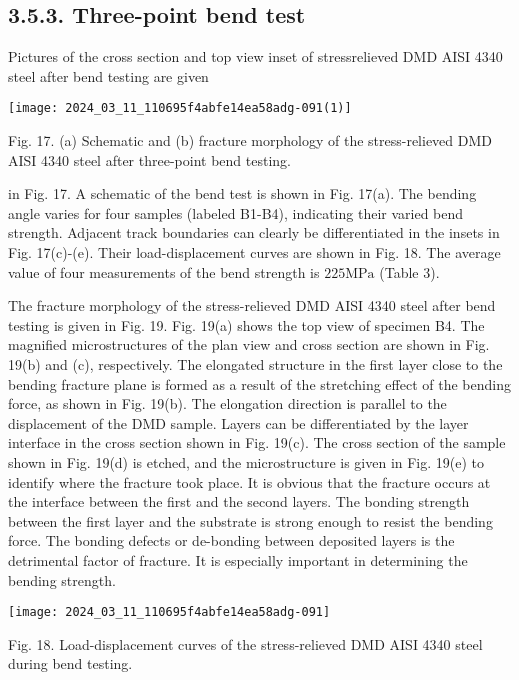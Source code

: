 \documentclass[10pt]{article}
\begin{document}
\subsection*{3.5.3. Three-point bend test}
Pictures of the cross section and top view inset of stressrelieved DMD AISI 4340 steel after bend testing are given

\begin{center}
\texttt{[image: 2024\_03\_11\_110695f4abfe14ea58adg-091(1)]}
\end{center}

Fig. 17. (a) Schematic and (b) fracture morphology of the stress-relieved DMD AISI 4340 steel after three-point bend testing.

in Fig. 17. A schematic of the bend test is shown in Fig. 17(a). The bending angle varies for four samples (labeled B1-B4), indicating their varied bend strength. Adjacent track boundaries can clearly be differentiated in the insets in Fig. 17(c)-(e). Their load-displacement curves are shown in Fig. 18. The average value of four measurements of the bend strength is $225 \mathrm{MPa}$ (Table 3).

The fracture morphology of the stress-relieved DMD AISI 4340 steel after bend testing is given in Fig. 19. Fig. 19(a) shows the top view of specimen B4. The magnified microstructures of the plan view and cross section are shown in Fig. 19(b) and (c), respectively. The elongated structure in the first layer close to the bending fracture plane is formed as a result of the stretching effect of the bending force, as shown in Fig. 19(b). The elongation direction is parallel to the displacement of the DMD sample. Layers can be differentiated by the layer interface in the cross section shown in Fig. 19(c). The cross section of the sample shown in Fig. 19(d) is etched, and the microstructure is given in Fig. 19(e) to identify where the fracture took place. It is obvious that the fracture occurs at the interface between the first and the second layers. The bonding strength between the first layer and the substrate is strong enough to resist the bending force. The bonding defects or de-bonding between deposited layers is the detrimental factor of fracture. It is especially important in determining the bending strength.

\begin{center}
\texttt{[image: 2024\_03\_11\_110695f4abfe14ea58adg-091]}
\end{center}

Fig. 18. Load-displacement curves of the stress-relieved DMD AISI 4340 steel during bend testing.
\end{document}
